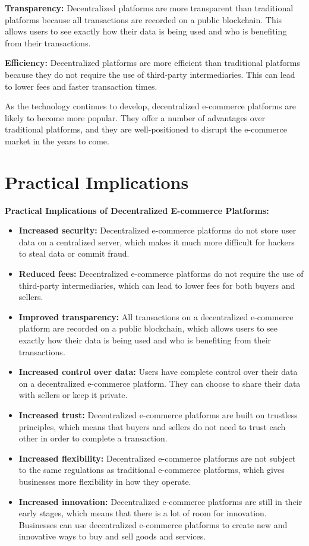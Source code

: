 \documentclass{report}
\begin{document}
\textbf{Transparency:} Decentralized platforms are more transparent than traditional platforms because all transactions are recorded on a public blockchain. This allows users to see exactly how their data is being used and who is benefiting from their transactions.

\textbf{Efficiency:} Decentralized platforms are more efficient than traditional platforms because they do not require the use of third-party intermediaries. This can lead to lower fees and faster transaction times.

As the technology continues to develop, decentralized e-commerce platforms are likely to become more popular. They offer a number of advantages over traditional platforms, and they are well-positioned to disrupt the e-commerce market in the years to come.




\section{Practical Implications}

    


\textbf{Practical Implications of Decentralized E-commerce Platforms:}

\begin{itemize}
  \item \textbf{Increased security:} Decentralized e-commerce platforms do not store user data on a centralized server, which makes it much more difficult for hackers to steal data or commit fraud.
  \item \textbf{Reduced fees:} Decentralized e-commerce platforms do not require the use of third-party intermediaries, which can lead to lower fees for both buyers and sellers.
  \item \textbf{Improved transparency:} All transactions on a decentralized e-commerce platform are recorded on a public blockchain, which allows users to see exactly how their data is being used and who is benefiting from their transactions.
  \item \textbf{Increased control over data:} Users have complete control over their data on a decentralized e-commerce platform. They can choose to share their data with sellers or keep it private.
  \item \textbf{Increased trust:} Decentralized e-commerce platforms are built on trustless principles, which means that buyers and sellers do not need to trust each other in order to complete a transaction.
  \item \textbf{Increased flexibility:} Decentralized e-commerce platforms are not subject to the same regulations as traditional e-commerce platforms, which gives businesses more flexibility in how they operate.
  \item \textbf{Increased innovation:} Decentralized e-commerce platforms are still in their early stages, which means that there is a lot of room for innovation. Businesses can use decentralized e-commerce platforms to create new and innovative ways to buy and sell goods and services.
\end{itemize}
\end{document}
